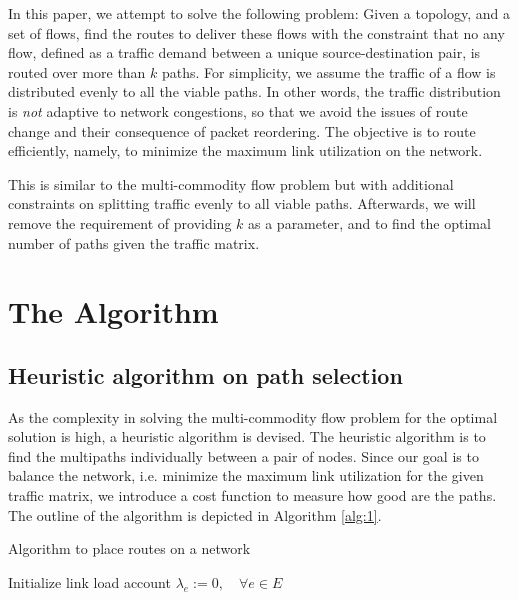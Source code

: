 \documentclass[conference]{IEEEtran}
\begin{document}
In this paper, we attempt to solve the following problem: Given a topology, and
a set of flows, find the routes to deliver these flows with the constraint that
no any flow, defined as a traffic demand between a unique source-destination
pair, is routed over more than $k$ paths. For simplicity, we assume the traffic
of a flow is distributed evenly to all the viable paths. In other words, the
traffic distribution is \emph{not} adaptive to network congestions, so that we
avoid the issues of route change and their consequence of packet reordering.
The objective is to route efficiently, namely, to minimize the maximum link
utilization on the network.

This is similar to the multi-commodity flow problem \cite{pm04} but with
additional constraints on splitting traffic evenly to all viable paths.
Afterwards, we will remove the requirement of providing $k$ as a parameter, and
to find the optimal number of paths given the traffic matrix.

\section{The Algorithm}\label{sec:algo}

\subsection{Heuristic algorithm on path selection}
As the complexity in solving the multi-commodity flow problem for the optimal
solution is high, a heuristic algorithm is devised. The heuristic algorithm is
to find the multipaths individually between a pair of nodes. Since our goal is
to balance the network, i.e. minimize the maximum link utilization for the
given traffic matrix, we introduce a cost function to measure how good are the
paths. The outline of the algorithm is depicted in Algorithm \ref{alg:1}.

\begin{algorithm}
\caption{Algorithm to place routes on a network}\label{alg:1}
Initialize link load account $\lambda_e :=0,\quad\forall e\in E$\;
\end{algorithm}
\end{document}
